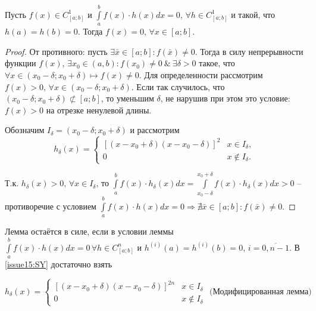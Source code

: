 \begin{lemma}
	Пусть $f(x) \in C^1_{[a;b]}$ и $\int \limits_a^b f(x) \cdot h(x) dx = 0, \, \forall h \in C^1_{[a;b]}$ и такой, что $h(a) = h(b) = 0$. Тогда $f(x) = 0, \, \forall x \in [a;b]$.
\end{lemma}

\begin{proof}
	От противного: пусть $\exists \bar{x} \in [a;b]: f(\bar{x}) \neq 0$. Тогда в силу непрерывности функции $f(x)$, $\exists x_0 \in (a, b): f(x_0) \neq 0 ~\&~ \exists \delta > 0$ такое, что $\forall x \in (x_0 - \delta; x_0 + \delta) \mapsto f(x) \neq 0$. 
    Для определенности рассмотрим $f(x) > 0, \, \forall x \in (x_0 - \delta; x_0 + \delta)$. 
    Если так случилось, что $(x_0 - \delta; x_0 + \delta) \not\subset [a;b]$, то уменьшим $\delta$, не нарушив при этом это условие: $f(x) > 0$ на отрезке ненулевой длины. 

    Обозначим $I_{\delta} = (x_0 - \delta; x_0 + \delta)$ и рассмотрим 
    \begin{equation} \label{issue15:SY}
        h_{\delta}(x) = \begin{cases}
            \left[(x - x_0 + \delta)(x - x_0 - \delta)\right]^2 & x \in I_{\delta},\\
            0 & x \not\in I_{\delta}.
            \end{cases}
    \end{equation}
    
    Т.к. $h_{\delta}(x) > 0, \, \forall x \in I_{\delta}$, то $\int \limits_a^b f(x) \cdot h_{\delta}(x) dx  = \int \limits_{x_0 - \delta}^{x_0 + \delta} f(x) \cdot h_{\delta}(x) dx > 0$ 
    -- противоречие с условием $\int \limits_a^b f(x) \cdot h(x) dx = 0  \Rightarrow \nexists \bar{x} \in [a;b]: f(\bar{x}) \neq 0$. 
\end{proof}

    \begin{remark}
    	
    	Лемма остаётся в силе, если в условии леммы $\int \limits_a^b f(x) \cdot h(x) dx = 0 \, \forall h \in C^n_{[a;b]}$ и $h^{(i)}(a) = h^{(i)}(b) = 0, \, i = \overline{0, n-1}$. В \eqref{issue15:SY} достаточно взять 
    	
    	\begin{equation} \label{issue15:SY}
    		h_{\delta}(x) = \begin{cases}
    			\left[(x - x_0 + \delta)(x - x_0 - \delta)\right]^{2n} & x \in I_{\delta}\\
    			0 & x \not\in I_{\delta}
    		\end{cases} 
    		\text{  (Модифицированная лемма)}
    	\end{equation}
    \end{remark}
    
